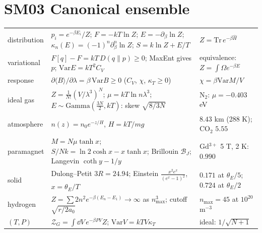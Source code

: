\documentclass[9pt]{article}
\begin{document}
\section*{SM03 Canonical ensemble}
\begin{tabular}{@{}p{2.9cm}p{8.9cm}p{5.6cm}@{}}
\toprule
distribution & $p_i=e^{-\beta E_i}/Z$; $F=-kT\ln Z$; $E=-\partial_\beta\ln Z$; $\kappa_n(E)=(-1)^n\partial_\beta^n\ln Z$; $S=k\ln Z+E/T$ & $Z=\mathrm{Tr}\,e^{-\beta\hat H}$\\
variational & $F[q]-F=kT\,D(q\|p)\ge0$; MaxEnt gives $p$; $\mathrm{Var}E=kT^2C_V$ & equivalence: $Z=\int\Omega e^{-\beta E}$\\
response & $\partial\langle B\rangle/\partial\lambda=\beta\,\mathrm{Var}B\ge0$ ($C_V$, $\chi$, $\kappa_T\ge0$) & $\chi=\beta\mathrm{Var}M/V$\\
ideal gas & $Z=\tfrac1{N!}(V/\lambda^3)^N$; $\mu=kT\ln n\lambda^3$; $E\sim\mathrm{Gamma}(\tfrac{3N}2,kT)$: skew $\sqrt{8/3N}$ & N$_2$: $\mu=-0.403$ eV\\
atmosphere & $n(z)=n_0e^{-z/H}$, $H=kT/mg$ & $8.43$ km (288 K); CO$_2$ $5.55$\\
paramagnet & $M=N\mu\tanh x$; $S/Nk=\ln2\cosh x-x\tanh x$; Brillouin $\mathcal B_J$; Langevin $\coth y-1/y$ & Gd$^{3+}$ 5 T, 2 K: $0.990$\\
solid & Dulong--Petit $3R=24.94$; Einstein $\tfrac{x^2e^x}{(e^x-1)^2}$, $x=\theta_E/T$ & $0.171$ at $\theta_E/5$; $0.724$ at $\theta_E/2$\\
hydrogen & $Z=\sum2n^2e^{-\beta(E_n-E_1)}\to\infty$ as $n_{\max}^3$; cutoff $\sqrt{r/2a_0}$ & $n_{\max}=45$ at $10^{20}$ m$^{-3}$\\
$(T,P)$ & $\mathcal Z_G=\int\dd V\,e^{-\beta PV}Z$; $\mathrm{Var}V=kTV\kappa_T$ & ideal: $1/\sqrt{N+1}$\\
\bottomrule
\end{tabular}
\end{document}
